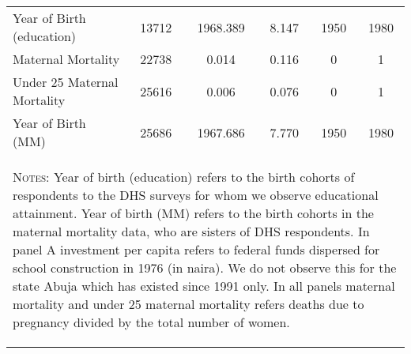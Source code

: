 \begin{subtables}
\begin{table}[htpb!]
\begin{center}
\begin{tabular}{l c c c c c}
Year of Birth (education)	&	13712	&	1968.389	&	8.147	&	1950	&	1980	\\
Maternal Mortality	&	22738	&	0.014	&	0.116	&	0	&	1	\\
Under 25 Maternal Mortality	&	25616	&	0.006	&	0.076	&	0	&	1	\\
Year of Birth (MM)	&	25686	&	1967.686	&	7.770	&	1950	&	1980	\\
\midrule											
\multicolumn{6}{p{12cm}}{\begin{footnotesize}\textsc{Notes:}  Year of birth (education) refers to the birth cohorts of respondents to the DHS surveys for whom we observe educational attainment.  Year of birth (MM) refers to the birth cohorts in the maternal mortality data, who are sisters of DHS respondents.  In panel A investment per capita refers to federal funds dispersed for school construction in 1976 (in naira).  We do not observe this for the state Abuja which has existed since 1991 only.  In all panels maternal mortality and under 25 maternal mortality refers deaths due to pregnancy divided by the total number of women. \end{footnotesize}} \\											
\bottomrule											
\end{tabular}											
\end{center}											
\end{table}											
\end{subtables}












